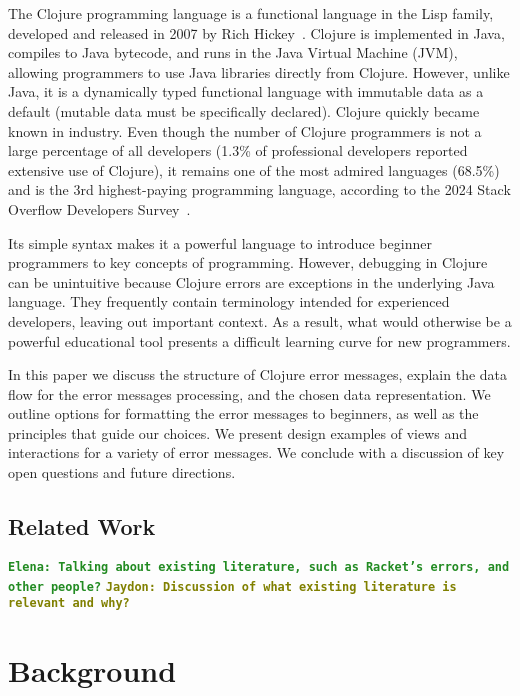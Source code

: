 \documentclass[12pt]{article}
\newcommand{\comment}[1]{{\bf \tt  {#1}}}
\newcommand{\emcomment}[1]{\textcolor{ForestGreen}{\comment{Elena: {#1}}}}
\newcommand{\jscomment}[1]{\textcolor{olive}{\comment{Jaydon: {#1}}}}
\begin{document}
The Clojure programming language is a functional language in the Lisp family, developed and released in 2007 
by Rich Hickey~\cite{Hickey:2008}. 
Clojure is implemented in Java, compiles to Java bytecode, and runs in the Java Virtual Machine (JVM), 
allowing programmers to use Java libraries directly from Clojure. 
However, unlike Java, it is a dynamically typed functional language with immutable data as a default (mutable data 
must be specifically declared).
Clojure quickly became known in industry. Even though the number of Clojure programmers is not a large percentage
of all developers (1.3\% of professional developers reported extensive use of Clojure), it remains one of the most admired languages (68.5\%) and is the 3rd highest-paying programming language, according to the 2024 Stack Overflow Developers Survey~\cite{survey}.

Its simple syntax makes it a powerful language to introduce beginner programmers to key concepts of programming.
However, debugging in Clojure can be unintuitive because Clojure errors are exceptions in the underlying Java language. 
They frequently contain terminology intended for experienced developers, leaving out important context. 
As a result, what would otherwise be a powerful educational tool presents a difficult learning curve for new programmers.

In this paper we discuss the structure of Clojure error messages, 
explain the data flow for the error messages processing, 
and the chosen data representation. 
We outline options for formatting the error messages to beginners, as well as the principles that guide our choices. 
We present design examples of views and interactions for a variety of error messages. 
We conclude with a discussion of key open questions and future directions. 



\subsection{Related Work}\label{subsec:related}

\cite{cosmetic}

\emcomment{Talking about existing literature, such as Racket's errors, and other people?}
\jscomment{Discussion of what existing literature is relevant and why?}

\section{Background}\label{sec:background}
\end{document}
